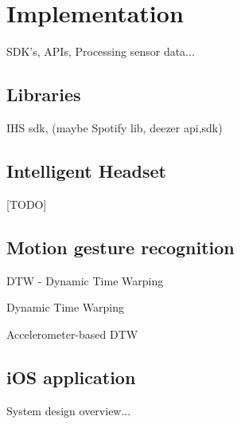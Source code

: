 \chapter{Implementation}
SDK's, APIs, Processing sensor data...


\section{Libraries}
IHS sdk, (maybe Spotify lib, deezer api,sdk)


\section{Intelligent Headset}
[TODO]


\section{Motion gesture recognition}
DTW - Dynamic Time Warping 

Dynamic Time Warping \cite{salvador_toward_2007}

Accelerometer-based DTW \cite{akl_accelerometer-based_2010}


\section{iOS application}
System design overview...



